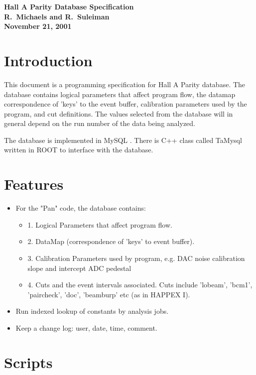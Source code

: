 \documentclass[12pt]{article}
\newcommand{\bcenter}{\begin{center}}
\newcommand{\ecenter}{\end{center}}
\newcommand{\bitem}{\begin{itemize}}
\newcommand{\eitem}{\end{itemize}}
\begin{document}
\bigskip

\bcenter\bf\Large
Hall A Parity Database Specification \\
\bigskip
\large R.~Michaels and R.~Suleiman \\
\medskip
November 21, 2001
\ecenter

\section{Introduction}

This document is a programming specification for Hall A Parity
database. The database contains logical parameters that affect
program flow, the datamap correspondence of 'keys' to the
event buffer, calibration parameters used by the program, and
cut definitions. The values selected from the database
will in general depend on the run number of the data being
analyzed.

The database is implemented in MySQL \cite{MySQL}. There is 
C++ class called TaMysql written in ROOT \cite{root} to 
interface with the database.

\section{Features}
\bitem

\item  For the "Pan" code, the database contains:

\bitem
     \item[1.] Logical Parameters that affect program flow.
     \item[2.] DataMap (correspondence of 'keys' to event buffer).
     \item[3.] Calibration Parameters used by program, e.g.
          DAC noise calibration slope and intercept
          ADC pedestal
    \item[4.] Cuts and the event intervals associated.
        Cuts include 'lobeam', 'bcm1', 'paircheck', 'doc',
        'beamburp' etc (as in HAPPEX I).  
\eitem

\item Run indexed lookup of constants by analysis jobs.

\item Keep a change log: user, date, time, comment.

\eitem

\section{Scripts}
\end{document}
